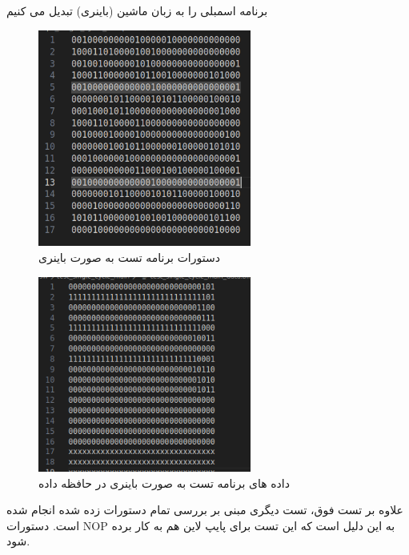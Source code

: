 \documentclass[11pt, a4paper]{article}
\begin{document}
	برنامه اسمبلی را به زبان ماشین (باینری) تبدیل می کنیم
	\begin{figure}[H]
		\begin{center}
			\includegraphics[width=7cm]{Photos/2.png}
		\end{center}
		\caption{دستورات برنامه تست به صورت باینری}
		\label{Inst_Mem}
	\end{figure}
	
	\begin{figure}[H]
		\begin{center}
			\includegraphics[width=7cm]{Photos/3.png}
		\end{center}
		\caption{داده های برنامه تست به صورت باینری در حافظه داده}
		\label{Data_Mem}
	\end{figure}
	
	
		
	علاوه بر تست فوق، تست دیگری مبنی بر بررسی تمام دستورات زده شده انجام شده است. دستورات NOP به این دلیل است که این تست برای پایپ لاین هم به کار برده شود.
	
\end{document}

